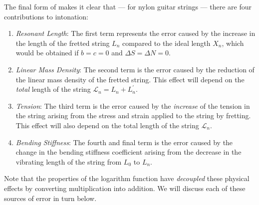 The final form of  makes it clear that --- for nylon guitar strings --- there are four contributions to intonation:
 \begin{enumerate}
  \item
   \emph{Resonant Length}: The first term represents the error caused by the increase in the length of the fretted string $L_n$ compared to the ideal length $X_n$, which would be obtained if $b = c = 0$ and $\Delta S = \Delta N = 0$.
  \item
   \emph{Linear Mass Density}: The second term is the error caused by the reduction of the linear mass density of the fretted string. This effect will depend on the \emph{total} length of the string $\mathcal{L}_n = L_n + L^\prime_n$.
  \item
   \emph{Tension}: The third term is the error caused by the \emph{increase} of the tension in the string arising from the stress and strain applied to the string by fretting. This effect will also depend on the total length of the string $\mathcal{L}_n$.
  \item
   \emph{Bending Stiffness}: The fourth and final term is the error caused by the change in the bending stiffness coefficient arising from the decrease in the vibrating length of the string from $L_0$ to $L_n$.
 \end{enumerate}
Note that the properties of the logarithm function have \emph{decoupled} these physical effects by converting multiplication into addition. We will discuss each of these sources of error in turn below.


